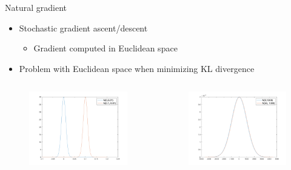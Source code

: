 \documentclass[aspectratio=169]{beamer}
\begin{document}
\begin{frame}{Natural gradient}
        \begin{itemize}
            \item Stochastic gradient ascent/descent
            \begin{itemize}
                \item Gradient computed in Euclidean space
            \end{itemize}
            \item Problem with Euclidean space when minimizing KL divergence
        \end{itemize}
    \begin{columns}
    \begin{column}{0.48\textwidth}
        \begin{figure}
        \includegraphics[width=\textwidth]{var_001.png}
        \end{figure}
    \end{column}
    \begin{column}{0.48\textwidth}
        \begin{figure}
        \includegraphics[width=\textwidth]{var_1000.png}
        \end{figure}
    \end{column}
    \end{columns}
\end{frame}
\end{document}
